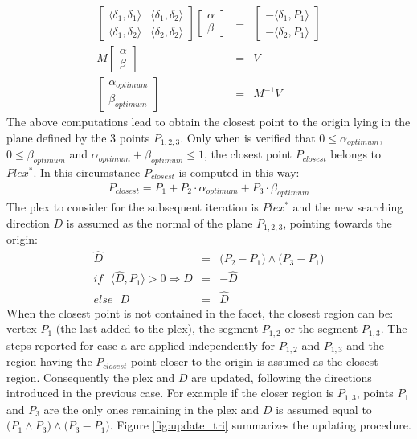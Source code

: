 \documentclass{article}
\begin{document}
\begin{itemize}
\begin{eqnarray}
\begin{bmatrix}
\langle \delta_1, \delta_1 \rangle & \langle \delta_1, \delta_2 \rangle \\ 
\langle \delta_1, \delta_2 \rangle & \langle \delta_2, \delta_2 \rangle 
\end{bmatrix} \begin{bmatrix} \alpha \\ \beta \end{bmatrix} &=& 
\begin{bmatrix} -\langle \delta_1, P_1 \rangle \\ -\langle \delta_2, P_1 \rangle \end{bmatrix} \nonumber\\
M \begin{bmatrix} \alpha \\ \beta \end{bmatrix} &=& V \nonumber\\
\begin{bmatrix} \alpha_{optimum} \\ \beta_{optimum} \end{bmatrix} &=& M^{-1}V
\end{eqnarray}
The above computations lead to obtain the closest point to the origin lying in the plane defined by the 3 points $P_{1,2,3}$.
Only when is verified that $0 \leq \alpha_{optimum}$, $0 \leq \beta_{optimum}$ and $\alpha_{optimum} + \beta_{optimum} \leq 1$, the closest point $P_{closest}$ belongs to $Plex^*$. In this circumstance $P_{closest}$ is computed in this way:
\begin{eqnarray}
P_{closest} = P_1 + P_2 \cdot \alpha_{optimum} + P_3 \cdot \beta_{optimum}
\label{eq:mix_seg_03}
\end{eqnarray}
The plex to consider for the subsequent iteration is $Plex^*$ and the new searching direction $D$ is assumed as the normal of the plane  $P_{1,2,3}$, pointing towards the origin:
\begin{eqnarray}
\hat{D} &=& \big( P_2 - P_1 \big) \wedge \big( P_3 - P_1 \big) \\
if \,\,\,\, \langle \hat{D}, P_1 \rangle > 0 \Rightarrow D &=& - \hat{D} \\
else \,\,\,\, D &=& \hat{D} 
\end{eqnarray}
When the closest point is not contained in the facet, the closest region can be: vertex $P_1$ (the last added to the plex), the segment $P_{1,2}$ or the segment $P_{1,3}$. The steps reported for case a are applied independently for $P_{1,2}$ and $P_{1,3}$ and the region having the $P_{closest}$ point closer to the origin is assumed as the closest region. Consequently the plex and $D$ are updated, following the directions introduced in the previous case. For example if the closer region is $P_{1,3}$, points $P_1$ and $P_3$ are the only ones remaining in the plex and $D$ is assumed equal to $\big ( P_1 \wedge P_3 \big ) \wedge \big ( P_3 - P_1 \big )$. Figure \ref{fig:update_tri} summarizes the updating procedure.


\end{itemize}
\end{document}
